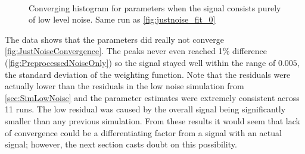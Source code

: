 \begin{figure}[H]
\centering
{}\\
\end{figure}

\begin{figure}[H]
\centering
{}
\caption{Converging histogram for parameters when the signal consists purely of low level noise. 
Same run as \autoref{fig:justnoise_fit_0}}
\label{fig:JustNoiseConvergence}
\end{figure}

The data shows that the parameters did really not converge
\autoref{fig:JustNoiseConvergence}.
The peaks never even reached 1\% difference
(\autoref{fig:PreprocessedNoiseOnly}) so  the signal  stayed 
well within the range of $0.005$, the standard deviation of the weighting function.
Note that the residuals
were actually lower than the residuals in the low noise simulation from \autoref{sec:SimLowNoise}
and the parameter estimates were extremely consistent across 11 runs. 
The low residual was caused by the overall
signal being significantly smaller than any previous simulation.
From these results it would seem that lack of convergence could be
a differentiating factor from a signal with an actual signal; however,
the next section casts doubt on this possibility. 


